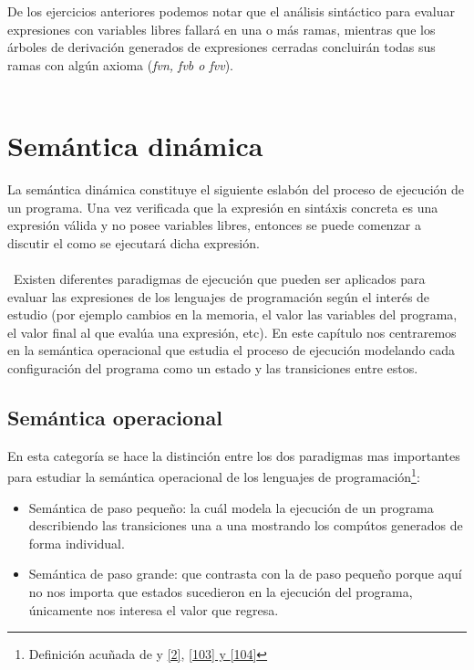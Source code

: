     \bigskip

    De los ejercicios anteriores podemos notar que el análisis sintáctico para evaluar  expresiones con variables libres fallará en una o más ramas, mientras que los árboles de derivación generados de expresiones cerradas concluirán todas sus ramas con algún axioma (\textit{fvn, fvb  o fvv}). \\\\

    \section{Semántica dinámica}
    La semántica dinámica constituye el siguiente eslabón del proceso de ejecución de un programa. Una vez verificada que la expresión en sintáxis concreta es una expresión válida y no posee variables libres, entonces se puede comenzar a discutir el como se ejecutará dicha expresión. \\\\\
   Existen diferentes paradigmas de ejecución que pueden ser aplicados para evaluar las expresiones de los lenguajes de programación según el interés de estudio (por ejemplo cambios en la memoria, el valor las variables del programa, el valor final al que evalúa una expresión, etc). En este capítulo nos centraremos en la semántica operacional que estudia el proceso de ejecución modelando cada configuración del programa como un estado y las transiciones entre estos.
    
    
    \subsection{Semántica operacional}
    En esta categoría se hace la distinción entre los dos paradigmas mas importantes para estudiar la semántica operacional de los lenguajes de programación\footnote{Definición acuñada de y  \hyperlink{2}{[2]}, \hyperlink{103}{[103] y  \hyperlink{104}{[104]}} }:
    \begin{itemize}
        \item Semántica de paso pequeño: la cuál modela la ejecución de un programa describiendo las transiciones una a una mostrando los compútos generados de forma individual. 
        \item Semántica de paso grande: que contrasta con la de paso pequeño porque aquí no nos importa que estados sucedieron en la ejecución del programa, únicamente nos interesa el valor que regresa.
    \end{itemize}

